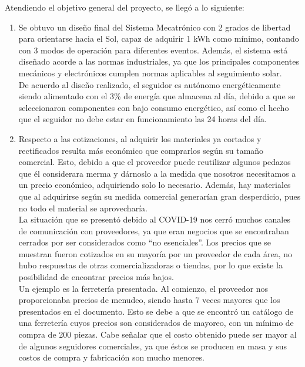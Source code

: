 Atendiendo el objetivo general del proyecto, se llegó a lo siguiente:
\begin{enumerate}
    \item Se obtuvo un diseño final del Sistema Mecatrónico con 2 grados de libertad para orientarse hacia el Sol, capaz de adquirir 1 kWh como mínimo, contando con 3 modos de operación para diferentes eventos. Además, el sistema está diseñado acorde a las normas industriales, ya que los principales componentes mecánicos y electrónicos cumplen normas aplicables al seguimiento solar.\\
    De acuerdo al diseño realizado, el seguidor es autónomo energéticamente siendo alimentado con el 3\% de energía que almacena al día, debido a que se seleccionaron componentes con bajo consumo energético, así como el hecho que el seguidor no debe estar en funcionamiento las 24 horas del día.
    \item Respecto a las cotizaciones, al adquirir los materiales ya cortados y rectificados resulta más económico que comprarlos según su tamaño comercial. Esto, debido a que el proveedor puede reutilizar algunos pedazos que él considerara merma y dárnoslo a la medida que nosotros necesitamos a un precio económico, adquiriendo solo lo necesario. Además, hay materiales que al adquirirse según su medida comercial generarían gran desperdicio, pues no todo el material se aprovecharía.\\
    La situación que se presentó debido al COVID-19 nos cerró muchos canales de comunicación con proveedores, ya que eran negocios que se encontraban cerrados por ser considerados como “no esenciales”. Los precios que se muestran fueron cotizados en su mayoría por un proveedor de cada área, no hubo respuestas de otras comercializadoras o tiendas, por lo que existe la posibilidad de encontrar precios más bajos.\\ 
    Un ejemplo es la ferretería presentada. Al comienzo, el proveedor nos proporcionaba precios de menudeo, siendo hasta 7 veces mayores que los presentados en el documento. Esto se debe a que se encontró un catálogo de una ferretería cuyos precios son considerados de mayoreo, con un mínimo de compra de 200 piezas. Cabe señalar que el costo obtenido puede ser mayor al de algunos seguidores comerciales, ya que éstos se producen en masa y sus costos de compra y fabricación son mucho menores.
\end{enumerate}

